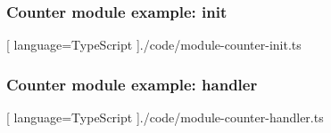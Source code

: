 \begin{frame}
  \frametitle{Counter module example: init}
  \begin{center}
    
    [ language=TypeScript
    ]{./code/module-counter-init.ts}
  \end{center}
\end{frame}

\begin{frame}
  \frametitle{Counter module example: handler}
  \begin{center}
    
    [ language=TypeScript
    ]{./code/module-counter-handler.ts}
  \end{center}
\end{frame}
